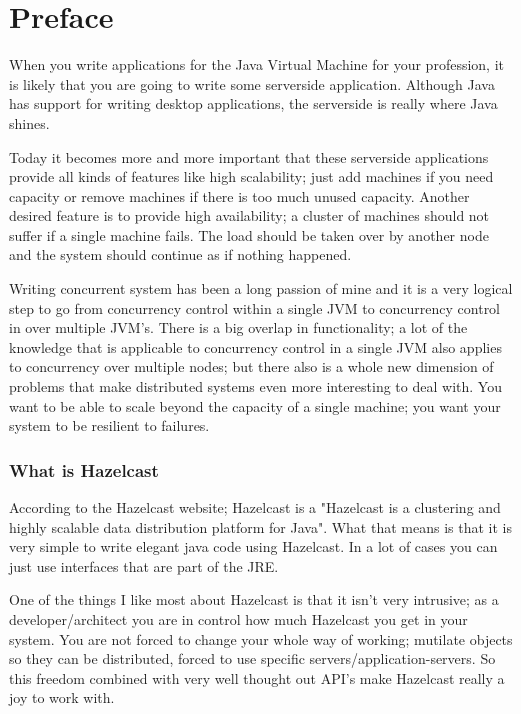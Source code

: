\chapter*{Preface}

When you write applications for the Java Virtual Machine for your profession, it is likely that you are going to write some 
serverside application. Although Java has support for writing desktop applications, the serverside is really where Java shines.

Today it becomes more and more important that these serverside applications provide all kinds of features like high scalability;
just add machines if you need capacity or remove machines if there is too much unused capacity. Another desired feature is to provide
high availability; a cluster of machines should not suffer if a single machine fails. The load should be taken over by another node and
the system should continue as if nothing happened.

Writing concurrent system has been a long passion of mine and it is a very logical step to go from concurrency control within
a single JVM to concurrency control in over multiple JVM's. There is a big overlap in functionality; a lot of the knowledge 
that is applicable to concurrency control in a single JVM also applies to concurrency over multiple nodes; but there also is a
whole new dimension of problems that make distributed systems even more interesting to deal with. You want to be able to scale 
beyond the capacity of a single machine; you want your system to be resilient to failures.

\subsection*{What is Hazelcast}
According to the Hazelcast website; Hazelcast is a "Hazelcast is a clustering and highly scalable data distribution platform for Java". 
What that means is that it is very simple to write elegant java code using Hazelcast. In a lot of cases you can just use interfaces 
that are part of the JRE.

One of the things I like most about Hazelcast is that it isn't very intrusive; as a developer/architect you are in control how much 
Hazelcast you get in your system. You are not forced to change your whole way of working; mutilate objects so they can be distributed,
forced to use specific servers/application-servers. So this freedom combined with very well thought out API's make Hazelcast really
a joy to work with.

